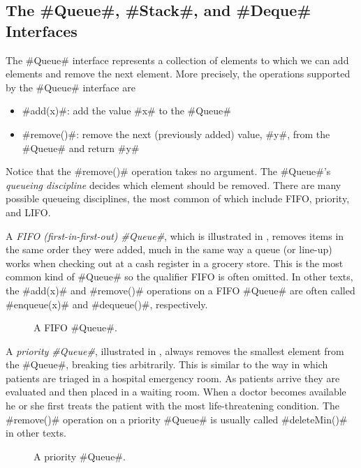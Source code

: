 \subsection{The #Queue#, #Stack#, and #Deque# Interfaces}

The #Queue# interface represents a collection of elements to which we
can add elements and remove the next element.  More precisely, the operations
supported by the #Queue# interface are
\begin{itemize}
  \item #add(x)#: add the value #x# to the #Queue#
  \item #remove()#: remove the next (previously added) value, #y#, from the #Queue# and return #y#
\end{itemize}
Notice that the #remove()# operation takes no argument.  The #Queue#'s
\emph{queueing discipline} decides which element should be removed.
There are many possible queueing disciplines, the most common of which
include FIFO, priority, and LIFO.

A \emph{FIFO (first-in-first-out) #Queue#},
%
%
which is illustrated in
, removes items in the same order they were added, much
in the same way a queue (or line-up) works when checking out at a cash
register in a grocery store.  This is the most common kind of #Queue#
so the qualifier FIFO is often omitted.  In other texts, the #add(x)#
and #remove()# operations on a FIFO #Queue# are often called #enqueue(x)#
and #dequeue()#, respectively.

\begin{figure}
  \caption[A FIFO queue]{A FIFO #Queue#.}
\end{figure}

A \emph{priority #Queue#},
%
%
%
illustrated in , always
removes the smallest element from the #Queue#, breaking ties arbitrarily.
This is similar to the way in which patients are triaged in a hospital
emergency room.  As patients arrive they are evaluated and then placed in
a waiting room.  When a doctor becomes available he or she first treats
the patient with the most life-threatening condition.  The #remove()#
operation on a priority #Queue# is usually called #deleteMin()# in
other texts.

\begin{figure}
  \caption[A priority queue]{A priority #Queue#.}
\end{figure}


